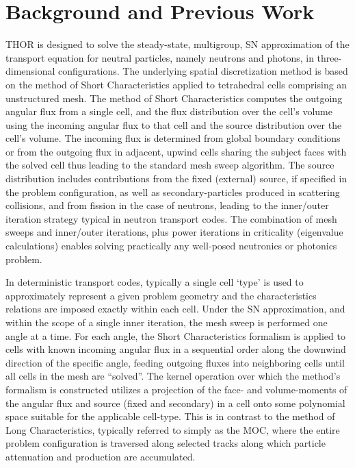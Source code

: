 \section{Background and Previous Work}

\ac{THOR} is designed to solve the steady-state, multigroup, \ac{SN} approximation of the transport equation for neutral particles, namely neutrons and photons, in three-dimensional configurations.
The underlying spatial discretization method is based on the method of Short Characteristics applied to tetrahedral cells comprising an unstructured mesh.
The method of Short Characteristics computes the outgoing angular flux from a single cell, and the flux distribution over the cell's volume using the incoming angular flux to that cell and the source distribution over the cell's volume.
The incoming flux is determined from global boundary conditions or from the outgoing flux in adjacent, upwind cells sharing the subject faces with the solved cell thus leading to the standard mesh sweep algorithm.
The source distribution includes contributions from the fixed (external) source, if specified in the problem configuration, as well as secondary-particles produced in scattering collisions, and from fission in the case of neutrons, leading to the inner/outer iteration strategy typical in neutron transport codes.
The combination of mesh sweeps and inner/outer iterations, plus power iterations in criticality (eigenvalue calculations) enables solving practically any well-posed neutronics or photonics problem.

In deterministic transport codes, typically a single cell `type' is used to approximately represent a given problem geometry and the characteristics relations are imposed exactly within each cell.
Under the \ac{SN} approximation, and within the scope of a single inner iteration, the mesh sweep is performed one angle at a time.
For each angle, the Short Characteristics formalism is applied to cells with known incoming angular flux in a sequential order along the downwind direction of the specific angle, feeding outgoing fluxes into neighboring cells until all cells in the mesh are ``solved''.
The kernel operation over which the method's formalism is constructed utilizes a projection of the face- and volume-moments of the angular flux and source (fixed and secondary) in a cell onto some polynomial space suitable for the applicable cell-type.
This is in contrast to the method of Long Characteristics, typically referred to simply as the \ac{MOC}, where the entire problem configuration is traversed along selected tracks along which particle attenuation and production are accumulated.

